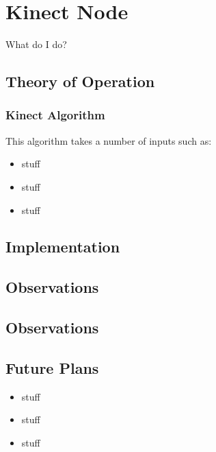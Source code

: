 \section{Kinect Node}

What do I do?

\subsection{Theory of Operation}


\subsubsection{Kinect Algorithm}
 This algorithm takes a number
of inputs such as:


\begin{itemize}
\item
  stuff
\item
  stuff
\item
  stuff
\end{itemize}


\subsection{Implementation}


\subsection{Observations}


\subsection{Observations}


\subsection{Future Plans}

\begin{itemize}
\item
  stuff
\item
  stuff
\item
  stuff
\end{itemize}
